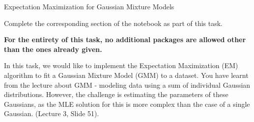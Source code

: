\documentclass[
	english,
        solution=true
	]{tudaexercise}
\begin{document}
\newpage

\begin{task}[points=6 + 4]{Expectation Maximization for Gaussian Mixture Models}
\begin{programmingtaskbox}
Complete the corresponding section of the notebook as part of this task.
\end{programmingtaskbox}

\textbf{For the entirety of this task, no additional packages are allowed other than the ones already given.}


In this task, we would like to implement the Expectation Maximization (EM) algorithm to fit a Gaussian Mixture Model (GMM) to a dataset. You have learnt from the lecture about GMM - modeling data using a sum of individual Gaussian distributions. However, the challenge is estimating the parameters of these Gaussians, as the MLE solution for this is more complex than the case of a single Gaussian. (Lecture 3, Slide 51). 


\end{task}
\end{document}
